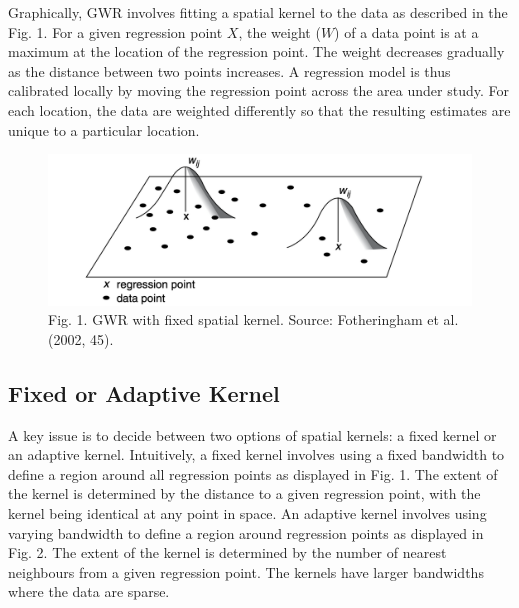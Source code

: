\documentclass[
  letterpaper,
  DIV=11,
  numbers=noendperiod,
  oneside]{scrreprt}
\begin{document}
Graphically, GWR involves fitting a spatial kernel to the data as
described in the Fig. 1. For a given regression point \(X\), the weight
(\(W\)) of a data point is at a maximum at the location of the
regression point. The weight decreases gradually as the distance between
two points increases. A regression model is thus calibrated locally by
moving the regression point across the area under study. For each
location, the data are weighted differently so that the resulting
estimates are unique to a particular location.

\begin{figure}[H]

{\centering \includegraphics{figs/ch8/fixed_bandwidth.png}

}

\caption{Fig. 1. GWR with fixed spatial kernel. Source: Fotheringham et
al. (2002, 45).}

\end{figure}%

\subsection{Fixed or Adaptive Kernel}\label{fixed-or-adaptive-kernel}

A key issue is to decide between two options of spatial kernels: a fixed
kernel or an adaptive kernel. Intuitively, a fixed kernel involves using
a fixed bandwidth to define a region around all regression points as
displayed in Fig. 1. The extent of the kernel is determined by the
distance to a given regression point, with the kernel being identical at
any point in space. An adaptive kernel involves using varying bandwidth
to define a region around regression points as displayed in Fig. 2. The
extent of the kernel is determined by the number of nearest neighbours
from a given regression point. The kernels have larger bandwidths where
the data are sparse.
\end{document}
